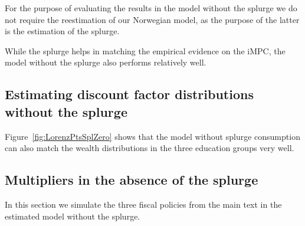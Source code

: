 \documentclass[\latexroot/\projectname]{subfiles}
\begin{document}
For the purpose of evaluating the results in the model without the splurge we do not require the reestimation of our Norwegian model, as the purpose of the latter is the estimation of the splurge.



While the splurge helps in matching the empirical evidence on the iMPC, the model without the splurge also performs relatively well. 



\subsection{Estimating discount factor distributions without the splurge}
\whenintegrated{\label{app:nosplurge-estimating-betas}} %

Figure~\ref{fig:LorenzPtsSplZero} shows that the model without splurge consumption can also match the wealth distributions in the three education groups very well.




\subsection{Multipliers in the absence of the splurge}
\whenintegrated{\label{app:nosplurge-multipliers}} %

In this section we simulate the three fiscal policies from the main text in the estimated model without the splurge. 





\FloatBarrier

\smartbib
\end{document}

